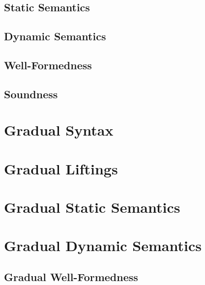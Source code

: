     \subsection{Static Semantics}
    \label{sec:static-semantics}
    
    
    \subsection{Dynamic Semantics}
    \label{ssec:dynamic-semantics}
    
    
    \subsection{Well-Formedness}
    \label{sec:well-formedness}
    
    
    \subsection{Soundness}
    \label{ssec:soundness}
    

\section{Gradual Syntax}
\label{sec:cs-gradual-formulas}


\section{Gradual Liftings}
\label{sec:gradual-liftings}


\section{Gradual Static Semantics}
\label{sec:gradualize-hoare-rules}


\section{Gradual Dynamic Semantics}
\label{sec:gradual-dyn--semantics}


\subsection{Gradual Well-Formedness}
\label{ssec:well-formedness}


